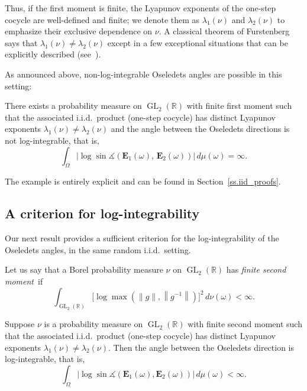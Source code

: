 \documentclass[AHL,Unicode,longabstracts,published]{cedram}
\newcommand{\R}{\mathbb{R}}
\newcommand{\E}{\mathbf{E}}
\DeclareMathOperator{\GL}{GL}
\renewcommand{\angle}{\measuredangle}
\DeclareMathOperator{\GL}{GL}
\newcommand{\R}{\mathbb{R}}
\begin{document}
Thus, if the first moment is finite, the Lyapunov exponents of the one-step cocycle are well-defined and finite; we denote them as $\lambda_1(\nu)$ and $\lambda_2(\nu)$ to emphasize their exclusive dependence on $\nu$. A classical theorem of Furstenberg says that $\lambda_1(\nu) \neq \lambda_2(\nu)$ except in a few exceptional situations that can be explicitly described (see~\cite{DF,ledrappier}).

As announced above, non-log-integrable Oseledets angles are possible in this setting:

\begin{theo}\label{t.nonintegrable}
There exists a probability measure on $\GL_2(\R)$ with finite first moment such that the associated i.i.d.~product (one-step cocycle) has distinct Lyapunov exponents $\lambda_1(\nu) \neq \lambda_2(\nu)$ and the angle between the Oseledets directions is not log-integrable, that is,
\begin{equation}
\int_{\Omega}\left|\log\sin \angle\left(\E_1(\omega),\,\E_2(\omega)\right) \right|\, d\mu(\omega) = \infty.
\end{equation}
\end{theo}

The example is entirely explicit and can be found in Section~\ref{ss.iid_proofs}.

\subsection{A criterion for log-integrability}

Our next result provides a sufficient criterion for the log-integrability of the Oseledets angles, in the same random i.i.d.~setting.

Let us say that a Borel probability measure $\nu$ on $\GL_2(\R)$ has \emph{finite second moment}~if
\begin{equation}
\int_{\GL_2(\R)} \bigl[\log \max \left(\|g\|, \left\|g^{-1}\right\|\right) \bigr]^2 \, d\nu(\omega) < \infty.
\end{equation}

\begin{theo}\label{t.integrable}
Suppose $\nu$ is a probability measure on $\GL_2(\R)$ with finite second moment such that the associated i.i.d.~product (one-step cocycle) has distinct Lyapunov exponents $\lambda_1(\nu) \neq \lambda_2(\nu)$. Then the angle between the Oseledets direction is log-integrable, that is,
\begin{equation}
\int_{\Omega}\left|\log\sin \angle(\E_1(\omega),\E_2(\omega)) \right|\, d\mu(\omega) < \infty.
\end{equation}
\end{theo}
\end{document}
